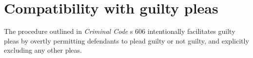 \section{Compatibility with guilty pleas}

The procedure outlined in \textit{Criminal Code} s 606 intentionally facilitates guilty pleas by overtly permitting defendants to plead guilty or not guilty, and explicitly excluding any other pleas. 